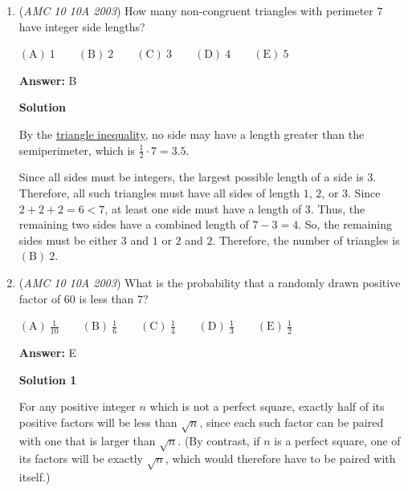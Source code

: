\begin{enumerate}
\textbf{Solution}

We start by looking at the answers. Examining statement C, we notice:

 $x \heartsuit 0 = |x-0| = |x|$
$|x| \neq x$ when $x<0$, but statement C says that it does for all $x$. 

 Therefore the statement that is not true is $\boxed{\mathrm{(C)}\ x\heartsuit 0=x\ \text{for all}\ x}$



	\item (\textit{AMC 10 10A 2003}) How many non-congruent triangles with perimeter $7$ have integer side lengths? 


 $\mathrm{(A) \ } 1\qquad \mathrm{(B) \ } 2\qquad \mathrm{(C) \ } 3\qquad \mathrm{(D) \ } 4\qquad \mathrm{(E) \ } 5$

 \textbf{Answer: }B



\textbf{Solution}

By the \href{https://artofproblemsolving.com/wiki/index.php?title=Triangle\_inequality}{triangle inequality}, no side may have a length greater than the semiperimeter, which is $\frac{1}{2}\cdot7=3.5$. 

 Since all sides must be integers, the largest possible length of a side is $3$. Therefore, all such triangles must have all sides of length $1$, $2$, or $3$. Since $2+2+2=6<7$, at least one side must have a length of $3$. Thus, the remaining two sides have a combined length of $7-3=4$. So, the remaining sides must be either $3$ and $1$ or $2$ and $2$. Therefore, the number of triangles is $\boxed{\mathrm{(B)}\ 2}$.

 


	\item (\textit{AMC 10 10A 2003}) What is the probability that a randomly drawn positive factor of $60$ is less than $7$?


 $\mathrm{(A) \ } \frac{1}{10}\qquad \mathrm{(B) \ } \frac{1}{6}\qquad \mathrm{(C) \ } \frac{1}{4}\qquad \mathrm{(D) \ } \frac{1}{3}\qquad \mathrm{(E) \ } \frac{1}{2}$

 \textbf{Answer: }E



\textbf{Solution 1}

For any positive integer $n$ which is not a perfect square, exactly half of its positive factors will be less than $\sqrt{n}$, since each such factor can be paired with one that is larger than $\sqrt{n}$. (By contrast, if $n$ is a perfect square, one of its factors will be exactly $\sqrt{n}$, which would therefore have to be paired with itself.)


\end{enumerate}
